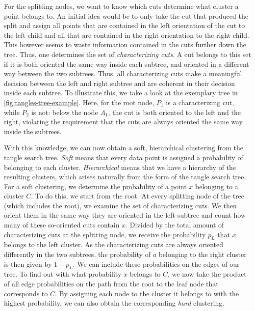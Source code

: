 For the splitting nodes, we want to know which cuts determine what cluster a point belongs to. An initial idea would be to only take the cut that produced the split
and assign all points that are contained in the left orientation of the cut to the
left child and all that are contained in the right orientation to the right child. This
however seems to waste information contained in the cuts further down the tree. 
Thus, one determines the set of \textit{characterizing cuts}.  
A cut belongs to this set if it is both oriented the same way inside each subtree, and oriented in a different way between the two subtrees. Thus, all characterizing cuts make a meaningful decision between the left and right subtree and are coherent in their decision inside each subtree. 
To illustrate this, we take a look at the exemplary tree in \autoref{fig:tangles-tree-example}. Here, for the root node, $P_1$ is a characterizing cut,
while $P_2$ is not: below the node $A_1$, the cut is both oriented to the left and the right, violating the requirement that the cuts are always oriented
the same way inside the subtrees. 

With this knowledge, we can now obtain a soft, hierarchical clustering from the tangle search tree. 
\textit{Soft} means that every data point is assigned
a probability of belonging to each cluster. 
\textit{Hierarchical} means that we have a hierarchy of the resulting clusters, which arises naturally
from the form of the tangle search tree. 
For a soft clustering, we determine the probability of a point $x$ belonging to a cluster $C$. 
To do this, we start from the root. At every splitting node of the tree (which includes the root), we examine the set of characterizing cuts.
We then orient them in the same way they are oriented in the left subtree and count how many of these so-oriented cuts contain $x$. Divided by the total amount of characterizing cuts at the
splitting node, we receive the probability $p_L$ that $x$ belongs to the left cluster. As the characterizing cuts are always oriented differently in the two subtrees, the probability
of $a$ belonging to the right cluster is then given by $1 - p_L$. We can include these probabilities on the edges of our tree. 
To find out with what probability $x$ belongs to $C$, 
we now take the product of all edge probabilities on the path from the root to the leaf node that corresponds to $C$. 
By assigning each node to the cluster it belongs to with the highest probability, we can also obtain the corresponding \textit{hard} clustering.


